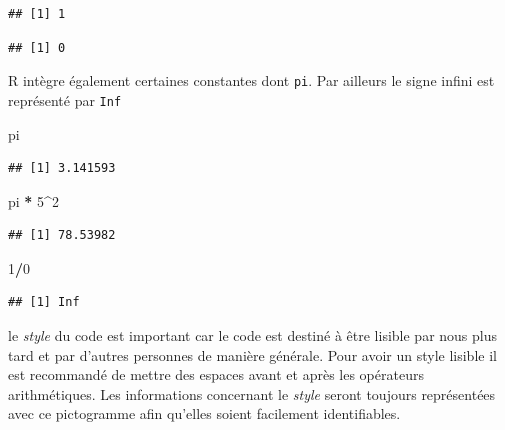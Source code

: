 \documentclass[]{book}
\makeatletter
\newenvironment{Shaded}{\begin{snugshade}}{\end{snugshade}}
\newcommand{\DecValTok}[1]{\textcolor[rgb]{0.00,0.00,0.81}{#1}}
\newcommand{\StringTok}[1]{\textcolor[rgb]{0.31,0.60,0.02}{#1}}
\newcommand{\OperatorTok}[1]{\textcolor[rgb]{0.81,0.36,0.00}{\textbf{#1}}}
\newcommand{\NormalTok}[1]{#1}
\newenvironment{kframe}{%
\medskip{}
\setlength{\fboxsep}{.8em}
 \def\at@end@of@kframe{}%
 \ifinner\ifhmode%
  \def\at@end@of@kframe{\end{minipage}}%
  \begin{minipage}{\columnwidth}%
 \fi\fi%
 \def\FrameCommand##1{\hskip\@totalleftmargin \hskip-\fboxsep
 \colorbox{shadecolor}{##1}\hskip-\fboxsep
     \hskip-\linewidth \hskip-\@totalleftmargin \hskip\columnwidth}%
 \MakeFramed {\advance\hsize-\width
   \@totalleftmargin\z@ \linewidth\hsize
   \@setminipage}}%
 {\par\unskip\endMakeFramed%
 \at@end@of@kframe}
\newenvironment{rmdblock}[1]
  {
  \begin{itemize}
  \renewcommand{\labelitemi}{
    \raisebox{-.7\height}[0pt][0pt]{
      {\setkeys{Gin}{width=3em,keepaspectratio}\texttt{[image: myIcons/\#1]}} %
    }
  }
  \setlength{\fboxsep}{1em}
  \begin{kframe}
  \item
  }
  {
  \end{kframe}
  \end{itemize}
  }
\newenvironment{rmdstyle}     %
  {\begin{rmdblock}{style}}   %
  {\end{rmdblock}}            %
\makeatother
\begin{document}
\begin{verbatim}
## [1] 1
\end{verbatim}

\begin{Shaded}
\end{Shaded}

\begin{verbatim}
## [1] 0
\end{verbatim}

R intègre également certaines constantes dont \texttt{pi}. Par ailleurs
le signe infini est représenté par \texttt{Inf}

\begin{Shaded}
\begin{Highlighting}[]
\NormalTok{pi}
\end{Highlighting}
\end{Shaded}

\begin{verbatim}
## [1] 3.141593
\end{verbatim}

\begin{Shaded}
\begin{Highlighting}[]
\NormalTok{pi }\OperatorTok{*}\StringTok{ }\DecValTok{5}\OperatorTok{^}\DecValTok{2}
\end{Highlighting}
\end{Shaded}

\begin{verbatim}
## [1] 78.53982
\end{verbatim}

\begin{Shaded}
\begin{Highlighting}[]
\DecValTok{1}\OperatorTok{/}\DecValTok{0}
\end{Highlighting}
\end{Shaded}

\begin{verbatim}
## [1] Inf
\end{verbatim}

\begin{rmdstyle}
le \emph{style} du code est important car le code est destiné à être
lisible par nous plus tard et par d'autres personnes de manière
générale. Pour avoir un style lisible il est recommandé de mettre des
espaces avant et après les opérateurs arithmétiques. Les informations
concernant le \emph{style} seront toujours représentées avec ce
pictogramme afin qu'elles soient facilement identifiables.
\end{rmdstyle}
\end{document}
